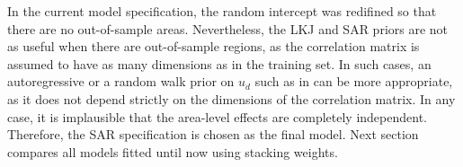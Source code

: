 In the current model specification, the random intercept was redifined so that there are no out-of-sample areas.
Nevertheless, the LKJ and SAR priors are not as useful when there are out-of-sample regions, as the correlation matrix is assumed to have as many dimensions as in the training set.
In such cases, an autoregressive or a random walk prior on $u_d$ such as in \cite{gao_improving_2021} can be more appropriate, as it does not depend strictly on the dimensions of the correlation matrix.
In any case, it is implausible that the area-level effects are completely independent.
Therefore, the SAR specification is chosen as the final model.
Next section compares all models fitted until now using stacking weights.














